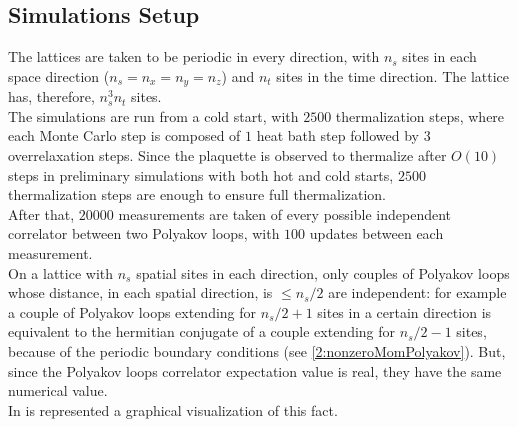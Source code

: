 \subsection{Simulations Setup}
The lattices are taken to be periodic in every direction, with $n_s$ sites in each space direction ($n_s=n_x=n_y=n_z$) and $n_t$ sites in the time direction.
The lattice has, therefore, $n_s^3n_t$ sites.\\
The simulations are run from a cold start, with $2500$ thermalization steps, where each Monte Carlo step is composed of $1$ heat bath step followed by $3$ overrelaxation steps.
Since the plaquette is observed to thermalize after $O(10)$ steps in preliminary simulations with both hot and cold starts, $2500$ thermalization steps are enough to ensure full thermalization.\\
After that, $20000$ measurements are taken of every possible independent correlator between two Polyakov loops, with $100$ updates between each measurement.\\
On a lattice with $n_s$ spatial sites in each direction, only couples of Polyakov loops whose distance, in each spatial direction, is $\leq n_s/2$ are independent: for example a couple of Polyakov loops extending for $n_s/2+1$ sites in a certain direction is equivalent to the hermitian conjugate of a couple extending for $n_s/2-1$ sites, because of the periodic boundary conditions (see \eqref{2:nonzeroMomPolyakov}).
But, since the Polyakov loops correlator expectation value is real, they have the same numerical value.\\
In  is represented a graphical visualization of this fact.
